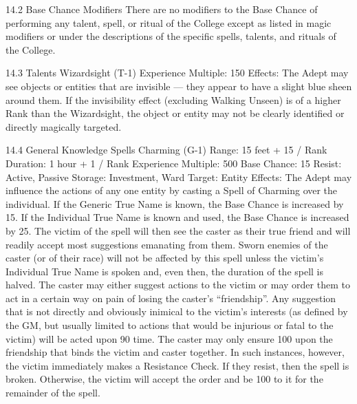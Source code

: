 \documentclass[a4paper]{article}
\begin{document}
\begin{multicols}{3}
14.2 Base Chance Modifiers
There are no modifiers to the Base Chance of performing any talent, spell, or ritual of the College
except as listed in magic modifiers or under the
descriptions of the specific spells, talents, and
rituals of the College.

14.3 Talents
Wizardsight (T-1)
Experience Multiple: 150
Effects: The Adept may see objects or entities that
are invisible — they appear to have a slight blue
sheen around them. If the invisibility effect (excluding Walking Unseen) is of a higher Rank than
the Wizardsight, the object or entity may not be
clearly identified or directly magically targeted.

14.4 General Knowledge Spells
Charming (G-1)
Range: 15 feet + 15 / Rank
Duration: 1 hour + 1 / Rank
Experience Multiple: 500
Base Chance: 15%
Resist: Active, Passive
Storage: Investment, Ward
Target: Entity
Effects: The Adept may influence the actions of
any one entity by casting a Spell of Charming over
the individual. If the Generic True Name is known,
the Base Chance is increased by 15. If the Individual True Name is known and used, the Base
Chance is increased by 25.
The victim of the spell will then see the caster as
their true friend and will readily accept most suggestions emanating from them. Sworn enemies of
the caster (or of their race) will not be affected by
this spell unless the victim’s Individual True Name
is spoken and, even then, the duration of the spell
is halved.
The caster may either suggest actions to the victim
or may order them to act in a certain way on pain
of losing the caster’s “friendship”. Any suggestion
that is not directly and obviously inimical to the
victim’s interests (as defined by the GM, but usually limited to actions that would be injurious or
fatal to the victim) will be acted upon 90%
time. The caster may only ensure 100%
upon the friendship that binds the victim and caster
together. In such instances, however, the victim
immediately makes a Resistance Check. If they
resist, then the spell is broken. Otherwise, the
victim will accept the order and be 100%
to it for the remainder of the spell.


\end{multicols}
\end{document}

